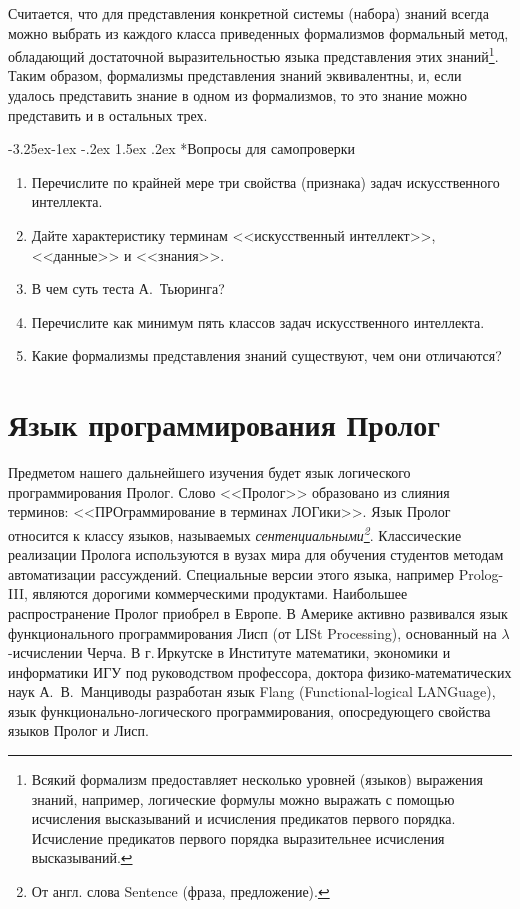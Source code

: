 \documentclass[12pt, openany, twoside]{book} %
\makeatletter
\renewcommand\subsubsection{\@startsection{subsubsection}{3}{\z@}%
                                     {-3.25ex\@plus -1ex \@minus -.2ex}%
                                     {1.5ex \@plus .2ex}%
                                     {\normalfont\normalsize\bfseries}}
\newenvironment{questions}{\subsubsection*{Вопросы для самопроверки}\begin{enumerate}}{\end{enumerate}}
\makeatother
\begin{document}
\medskip{} Считается, что для представления конкретной системы (набора) знаний всегда можно выбрать из каждого класса приведенных формализмов формальный метод, обладающий достаточной выразительностью языка представления этих знаний\footnote{Всякий формализм предоставляет несколько уровней (языков) выражения знаний, например, логические формулы можно выражать с помощью исчисления высказываний и исчисления предикатов первого порядка. Исчисление предикатов первого порядка выразительнее исчисления высказываний.}. Таким образом, формализмы представления знаний эквивалентны, и, если удалось представить знание в одном из формализмов, то это знание можно представить и в остальных трех.

\begin{questions}
\item{} Перечислите по крайней мере три свойства (признака) задач искусственного интеллекта.
\item{} Дайте характеристику терминам <<искусственный интеллект>>, <<данные>> и <<знания>>.
\item{} В чем суть теста А.~Тьюринга?
\item{} Перечислите как минимум пять классов задач искусственного интеллекта.
\item{} Какие формализмы представления знаний существуют, чем они отличаются?
\end{questions}

\chapter{Язык программирования Пролог}

Предметом нашего дальнейшего изучения будет язык логического программирования Пролог. Слово <<Пролог>> образовано из слияния терминов: <<ПРОграммирование в терминах ЛОГики>>. Язык Пролог относится к классу языков, называемых {\em сентенциальными\footnote{От англ. слова Sentence (фраза, предложение).}}.  Классические реализации Пролога используются в вузах мира для обучения студентов методам автоматизации рассуждений. Специальные версии этого языка, например Prolog-III, являются дорогими коммерческими продуктами. Наибольшее распространение Пролог приобрел в Европе. В Америке активно развивался язык функционального программирования Лисп (от LISt Processing), основанный на $\lambda$-исчислении Черча. В г.\,{}Иркутске в Институте математики, экономики и информатики ИГУ под руководством профессора, доктора фи\-зи\-ко-матема\-ти\-ческих наук А.~В.~Манциводы разработан язык Flang (Functio\-nal-logical LANGuage), язык функционально-логического программирования, опосредующего свойства языков Пролог и Лисп.
\end{document}
